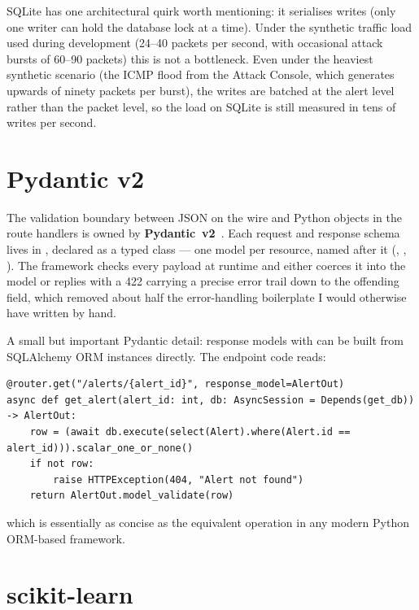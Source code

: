SQLite has one architectural quirk worth mentioning: it serialises
writes (only one writer can hold the database lock at a time). Under
the synthetic traffic load used during development (24--40 packets
per second, with occasional attack bursts of 60--90 packets) this is
not a bottleneck. Even under the heaviest synthetic scenario (the
ICMP flood from the Attack Console, which generates upwards of
ninety packets per burst), the writes are batched at the alert
level rather than the packet level, so the load on SQLite is
still measured in tens of writes per second.

\section{Pydantic v2}
\label{sec:tech-pydantic}

The validation boundary between JSON on the wire and Python
objects in the route handlers is owned by
\textbf{Pydantic~v2}~\cite{pydantic}. Each request and response
schema lives in , declared as a typed
class --- one model per resource, named after it
(, , ). The
framework checks every payload at runtime and either coerces it
into the model or replies with a 422 carrying a precise error
trail down to the offending field, which removed about half the
error-handling boilerplate I would otherwise have written by
hand.

A small but important Pydantic detail: response models with
 can be built
from SQLAlchemy ORM instances directly. The endpoint code reads:

\begin{lstlisting}[style=pyfile]
@router.get("/alerts/{alert_id}", response_model=AlertOut)
async def get_alert(alert_id: int, db: AsyncSession = Depends(get_db)) -> AlertOut:
    row = (await db.execute(select(Alert).where(Alert.id == alert_id))).scalar_one_or_none()
    if not row:
        raise HTTPException(404, "Alert not found")
    return AlertOut.model_validate(row)
\end{lstlisting}

\noindent which is essentially as concise as the equivalent operation
in any modern Python ORM-based framework.

\section{scikit-learn}
\label{sec:tech-sklearn}

